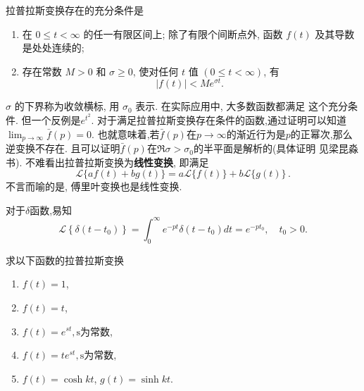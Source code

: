 拉普拉斯变换存在的充分条件是 
\begin{enumerate}
    \item[(1)]  在 $0 \leqslant t<\infty$ 的任一有限区间上; 除了有限个间断点外, 函数 $f(t)$ 及其导数是处处连续的;
    \item[(2)]  存在常数 $M>0$ 和 $\sigma \geqslant 0$, 使对任何 $t$ 值 $(0 \leqslant t<\infty)$, 有
    $$
    |f(t)|<M e^{\sigma t} \text {. }
    $$
\end{enumerate}
$\sigma$ 的下界称为收敛横标, 用 $\sigma_0$ 表示. 在实际应用中, 大多数函数都满足 这个充分条件.
但一个反例是$e^{t^2}$. 对于满足拉普拉斯变换存在条件的函数,通过证明可以知道$\lim_{p\to \infty} \bar{f}(p) = 0$.
也就意味着,若$\bar{f}(p)$在$p\to \infty$的渐近行为是$p$的正幂次,那么逆变换不存在. 且可以证明$\bar{f}(p)$在$\Re \sigma > \sigma_0$的半平面是解析的(具体证明
见梁昆淼书).
不难看出拉普拉斯变换为\textbf{线性变换}, 即满足
$$
\mathcal{L}\{a f(t)+b g(t)\}=a \mathcal{L}\{f(t)\}+b \mathcal{L}\{g(t)\} \,.
$$
不言而喻的是, 傅里叶变换也是线性变换.

对于$\delta$函数,易知
$$
\mathcal{L}\left\{\delta\left(t-t_0\right)\right\}=\int_0^{\infty} e^{-p t} \delta\left(t-t_0\right) d t=e^{-p t_0},  \quad t_0>0 .
$$
\begin{example}
    求以下函数的拉普拉斯变换
    \begin{enumerate}
        \item $f(t) = 1$,
        \item $f(t) = t$,
        \item $f(t) =e^{s t}, \textrm{s为常数}$,
        \item $f(t) = t e^{s t}, \textrm{s为常数}$,
        \item $f(t) = \cosh {k t}$, $g(t)= \sinh {kt}$.
    \end{enumerate}
\end{example}

